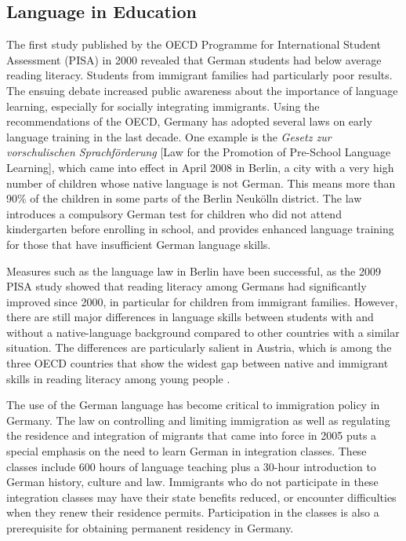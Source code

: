 \documentclass[]{../../metanetpaper}
\begin{document}
\begin{multicols}{2}
\subsection{Language in Education}

The first study published by the OECD Programme for International Student Assessment (PISA) in 2000 revealed that German students had below average reading literacy. Students from immigrant families had particularly poor results. The ensuing debate increased public awareness about the importance of language learning, especially for socially integrating immigrants. Using the recommendations of the OECD, Germany has adopted several laws on early language training in the last decade. One example is the \textit{Gesetz zur vorschulischen Sprachförderung} [Law for the Promotion of Pre-School Language Learning], which came into effect in April 2008 in Berlin, a city with a very high number of children whose native language is not German. This means more than 90\% of the children in some parts of the Berlin Neukölln district. The law introduces a compulsory German test for children who did not attend kindergarten before enrolling in school, and provides enhanced language training for those that have insufficient German language skills.

Measures such as the language law in Berlin have been successful, as the 2009 PISA study showed that reading literacy among Germans had significantly improved since 2000, in particular for children from immigrant families. However, there are still major differences in language skills between students with and without a native-language background compared to other countries with a similar situation. The differences are particularly salient in Austria, which is among the three OECD countries that show the widest gap between native and immigrant skills in reading literacy among young people \cite{Pisa1}.

The use of the German language has become critical to immigration policy in Germany. The law on controlling and limiting immigration as well as regulating the residence and integration of migrants that came into force in 2005 puts a special emphasis on the need to learn German in integration classes. These classes include 600 hours of language teaching plus a 30-hour introduction to German history, culture and law. Immigrants who do not participate in these integration classes may have their state benefits reduced, or encounter difficulties when they renew their residence permits. Participation in the classes is also a prerequisite for obtaining permanent residency in Germany.


\end{multicols}
\end{document}
